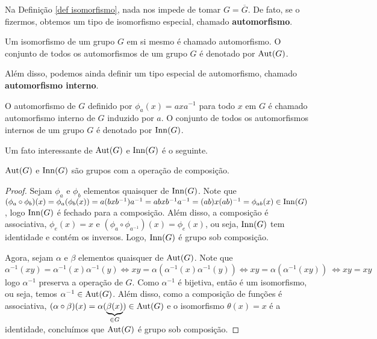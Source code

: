	Na Definição \ref{def isomorfismo}, nada nos
	impede de tomar $G = \overline{G}$. De fato, se o fizermos, obtemos
	um tipo de isomorfismo especial, chamado {\bf automorfismo}.
	\begin{definition}
	\label{def automorfismo}
		Um isomorfismo de um grupo $G$ em si mesmo é chamado 
		automorfismo. O conjunto de todos os automorfismos de um 
		grupo $G$ é denotado por $\operatorname{Aut}(G)$.
	\end{definition}
	Além disso, podemos ainda definir um tipo 
	especial de automorfismo, chamado {\bf automorfismo interno}.
	\begin{definition}
	\label{def automorfismo interno}
		O automorfismo de $G$ definido por $\phi_a(x) = axa^{-1}$ 
		para todo $x$ em $G$ é chamado automorfismo interno de $G$
		induzido por $a$. O conjunto de todos os automorfismos
		internos de um grupo $G$ é denotado por $\operatorname{Inn}(G)$.
	\end{definition}
	Um fato interessante de $\operatorname{Aut}(G)$ e $\operatorname{Inn}(G)$ 
	é o seguinte.
	\begin{theorem}
		$\operatorname{Aut}(G)$ e $\operatorname{Inn}(G)$ são grupos com a operação de composição.
	\end{theorem}
	\begin{proof}
		Sejam $\phi_a$ e $\phi_b$ elementos quaisquer de $\operatorname{Inn}(G)$. 
		Note que $(\phi_a\circ\phi_b)(x) = \phi_a(\phi_b(x)) 
		= a(bxb^{-1})a^{-1} = abxb^{-1}a^{-1} = (ab)x(ab)^{-1} 
		= \phi_{ab}(x) \in \operatorname{Inn}(G)$, logo $\operatorname{Inn}(G)$ é fechado para a
		composição. Além disso, a composição é associativa, 
		$\phi_e(x) = x$ e $(\phi_a\circ\phi_{a^{-1}})(x) = \phi_e(x)$, 
		ou seja, $\operatorname{Inn}(G)$ tem identidade e contém os inversos. 
		Logo, $\operatorname{Inn}(G)$ é grupo sob composição.
		\vspace{0.3cm}\par Agora, sejam $\alpha$ e $\beta$ elementos
		quaisquer de $\operatorname{Aut}(G)$. Note que
		\begin{equation*}
		    \alpha^{-1}(xy) = \alpha^{-1}(x)\alpha^{-1}(y) 
		    \iff xy = \alpha(\alpha^{-1}(x)\alpha^{-1}(y)) 
		    \iff xy = \alpha(\alpha^{-1}(xy))\ \iff xy = xy
		\end{equation*}
		logo $\alpha^{-1}$ preserva a operação de $G$. 
		Como $\alpha^{-1}$ é bijetiva, então é um isomorfismo, ou seja,
		temos $\alpha^{-1}\in \operatorname{Aut}(G)$. Além disso, como a composição
		de funções é associativa, $(\alpha\circ\beta)(x) 
		= \alpha(\underbrace{\beta(x)}_{\in G}) \in \operatorname{Aut}(G)$ e o
		isomorfismo $\theta(x) = x$ é a identidade, concluímos que
		$\operatorname{Aut}(G)$ é grupo sob composição.
	\end{proof}
